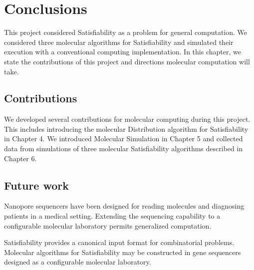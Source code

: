 \chapter{Conclusions}

This project considered {\sc Satisfiability} as a problem for general computation.  We considered three molecular algorithms for {\sc Satisfiability} and simulated their execution with a conventional computing implementation.  In this chapter, we state the contributions of this project and directions molecular computation will take.
	
	\section{Contributions}

We developed several contributions for molecular computing during this project.  This includes introducing the molecular Distribution algorithm for {\sc Satisfiability} in Chapter 4.  We introduced Molecular Simulation in Chapter 5 and collected data from simulations of three molecular {\sc Satisfiability} algorithms described in Chapter 6.  


	\section{Future work}
	
Nanopore sequencers have been designed for reading molecules and diagnosing patients in a medical setting.  Extending the sequencing capability to a configurable molecular laboratory permits generalized computation.

{\sc Satisfiability} provides a canonical input format for combinatorial problems.  Molecular algorithms for {\sc Satisfiability} may be constructed in gene sequencers designed as a configurable molecular laboratory. 




		
